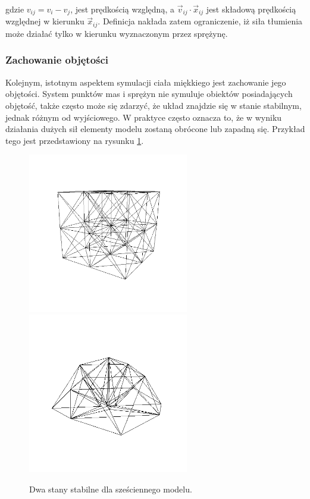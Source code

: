gdzie $v_{ij} = v_i - v_j$, jest prędkością względną, a $\vec{v}_{ij} \cdot \vec{x}_{ij}$ jest 
składową prędkością względnej w kierunku $\vec{x}_{ij}$. Definicja nakłada zatem
ograniczenie, iż siła tłumienia może działać tylko w kierunku wyznaczonym przez
sprężynę.

\subsubsection{Zachowanie objętości}
Kolejnym, istotnym aspektem symulacji ciała miękkiego jest zachowanie jego
objętości. System punktów mas i sprężyn nie symuluje obiektów posiadających
objętość, także często może się zdarzyć, że układ znajdzie się w stanie
stabilnym, jednak różnym od wyjściowego. W praktyce często oznacza to, że w
wyniku działania dużych sił elementy modelu zostaną obrócone lub zapadną się.
Przykład tego jest przedstawiony na rysunku \ref{stany}.

\begin{figure}[ht]
\centering
\includegraphics[width=7cm, height=7cm]{images/stabilny.png}
\includegraphics[width=7cm, height=7cm]{images/niestabilny.png}
\caption{Dwa stany stabilne dla sześciennego modelu.}
\label{stany}
\end{figure}


